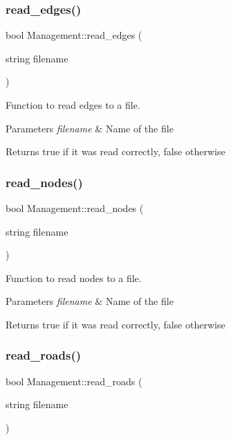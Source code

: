 \subsubsection{\texorpdfstring{read\+\_\+edges()}{read\_edges()}}
{\footnotesize\ttfamily bool Management\+::read\+\_\+edges (\begin{DoxyParamCaption}\item[{string}]{filename }\end{DoxyParamCaption})}



Function to read edges to a file. 


\begin{DoxyParams}{Parameters}
{\em filename} & Name of the file \\
\hline
\end{DoxyParams}
\begin{DoxyReturn}{Returns}
true if it was read correctly, false otherwise 
\end{DoxyReturn}
\mbox{\label{class_management_abd2b54f0edd1686ee127cff8816a2a2e}} 
\subsubsection{\texorpdfstring{read\+\_\+nodes()}{read\_nodes()}}
{\footnotesize\ttfamily bool Management\+::read\+\_\+nodes (\begin{DoxyParamCaption}\item[{string}]{filename }\end{DoxyParamCaption})}



Function to read nodes to a file. 


\begin{DoxyParams}{Parameters}
{\em filename} & Name of the file \\
\hline
\end{DoxyParams}
\begin{DoxyReturn}{Returns}
true if it was read correctly, false otherwise 
\end{DoxyReturn}
\mbox{\label{class_management_a67738d2358c0b97686e4fc47356d8b78}} 
\subsubsection{\texorpdfstring{read\+\_\+roads()}{read\_roads()}}
{\footnotesize\ttfamily bool Management\+::read\+\_\+roads (\begin{DoxyParamCaption}\item[{string}]{filename }\end{DoxyParamCaption})}




